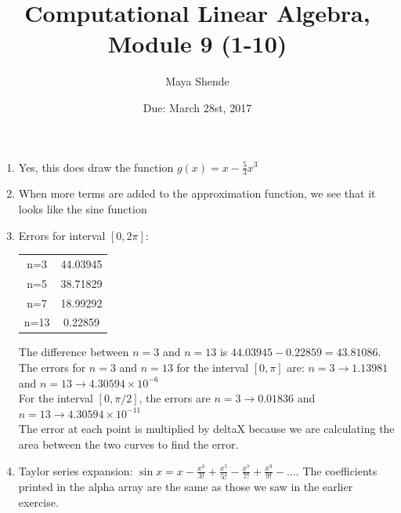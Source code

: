 \documentclass{article}
\title{Computational Linear Algebra, Module 9 (1-10)}
\author{Maya Shende}
\date{Due: March 28st, 2017}
\begin{document}
\maketitle

\begin{enumerate}

\item Yes, this does draw the function $g(x) = x-\frac{5}{3}x^3$

\item When more terms are added to the approximation function, we see that it looks like the sine function

\item 
Errors for interval $[0, 2\pi]:$\\
\begin{tabular}{|c|c|}
	\hline
	n=3	&44.03945\\
	n=5 	&38.71829\\
	n=7	&18.99292\\
	n=13	&0.22859\\	
	\hline
\end{tabular}
The difference between $n=3$ and $n=13$ is $44.03945-0.22859 = 43.81086$. The errors for $n=3$ and $n=13$ for the interval $[0,\pi]$ are: $n=3 \rightarrow 1.13981$ and $n=13 \rightarrow 4.30594 \times 10^{-6}$\\

For the interval $[0, \pi/2]$, the errors are $n=3 \rightarrow 0.01836$ and $n=13 \rightarrow 4.30594 \times 10^{-11}$\\

The error at each point is multiplied by deltaX because we are calculating the area between the two curves to find the error. 

\item Taylor series expansion: $\sin{x} = x - \frac{x^3}{3!} + \frac{x^5}{5!} - \frac{x^7}{7!} + \frac{x^9}{9!} - \dots$. The coefficients printed in the alpha array are the same as those we saw in the earlier exercise. 


\end{enumerate}
\end{document}
